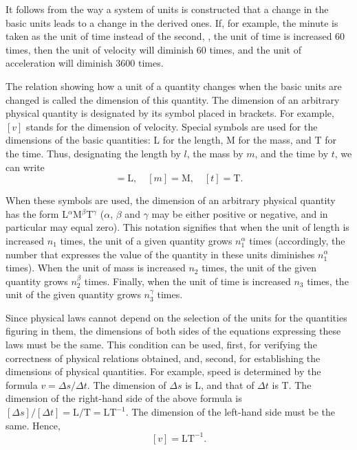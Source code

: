 It follows from the way a system of units is constructed that a change in the basic units leads to a change in the derived ones. If, for example, the minute is taken as the unit of time instead of the second, \ie, the unit of time is increased $60$ times, then the unit of velocity will diminish $60$ times, and the unit of acceleration will diminish $3600$ times.

The relation showing how a unit of a quantity changes when the basic units are changed is called the dimension of this quantity. The dimension of an arbitrary physical quantity is designated by its symbol placed in brackets. For example, $[v]$ stands for the dimension of velocity. Special symbols are used for the dimensions of the basic quantities: L for the length, M for the mass, and T for the time. Thus, designating the length by $l$, the mass by $m$, and the time by $t$, we can write
\begin{equation*}
[l] = \text{L},\quad [m] = \text{M},\quad [t] = \text{T}.
\end{equation*}

When these symbols are used, the dimension of an arbitrary physical quantity has the form L$^{\alpha}$M$^{\beta}$T$^{\gamma}$ ($\alpha$, $\beta$ and $\gamma$ may be either positive or negative, and in particular may equal zero). This notation signifies that when the unit of length is increased $n_1$ times, the unit of a given quantity grows $n_1^{\alpha}$ times (accordingly, the number that expresses the value of the quantity in these units diminishes $n_1^{\alpha}$ times). When the unit of mass is increased $n_2$ times, the unit of the given quantity grows $n_2^{\beta}$ times. Finally, when the unit of time is increased $n_3$ times, the unit of the given quantity grows $n_3^{\gamma}$ times.

Since physical laws cannot depend on the selection of the units for the quantities figuring in them, the dimensions of both sides of the equations expressing these laws must be the same. This condition can be used, first, for verifying the correctness of physical relations obtained, and, second, for establishing the dimensions of physical quantities. For example, speed is determined by the formula $v = \Delta s/\Delta t$. The dimension of $\Delta s$ is L, and that of $\Delta t$ is T. The dimension of the right-hand side of the above formula is $[\Delta s]/[\Delta t]=\text{L/T}=\text{LT}^{-1}$. The dimension of the left-hand side must be the same. Hence,
\begin{equation}\label{eq:2_14}
[v] = \text{LT}^{-1}.
\end{equation}

